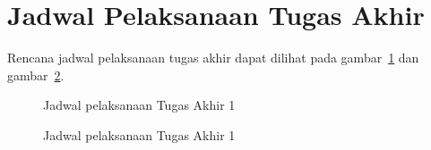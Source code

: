 \section{Jadwal Pelaksanaan Tugas Akhir}

Rencana jadwal pelaksanaan tugas akhir dapat dilihat pada gambar~\ref{jadwalTA1} dan gambar~\ref{jadwalTA2}.


\begin{figure}[H]
    
    \caption{
        \label{jadwalTA1}
        Jadwal pelaksanaan Tugas Akhir 1
    }
\end{figure}

\begin{figure}[H]
    
    \caption{
        \label{jadwalTA2}
        Jadwal pelaksanaan Tugas Akhir 1
    }
\end{figure}
